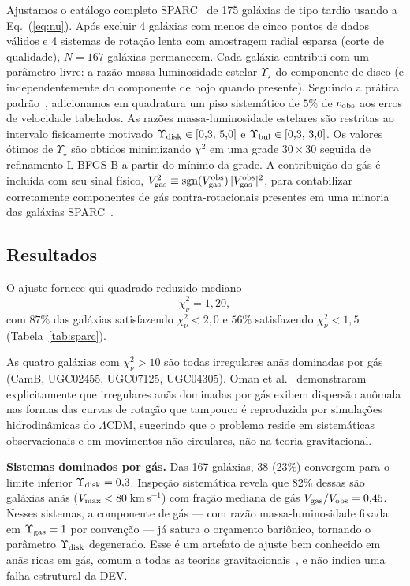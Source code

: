 \documentclass[aps,prd,twocolumn,showpacs,superscriptaddress]{revtex4-2}
\newcommand{\LCDM}{$\Lambda$CDM}
\begin{document}
Ajustamos o catálogo completo SPARC~\cite{Lelli2016} de 175
galáxias de tipo tardio usando a Eq.~(\ref{eq:nu}).
Após excluir 4 galáxias com menos de cinco pontos de dados
válidos e 4 sistemas de rotação lenta com amostragem radial
esparsa (corte de qualidade), $N=167$ galáxias permanecem.
Cada galáxia contribui com um parâmetro livre: a razão
massa-luminosidade estelar $\Upsilon_\star$ do componente de
disco (e independentemente do componente de bojo quando presente).
Seguindo a prática padrão~\cite{Li2018}, adicionamos em quadratura
um piso sistemático de $5\%$ de $v_{\rm obs}$ aos erros de
velocidade tabelados.
As razões massa-luminosidade estelares são restritas ao intervalo
fisicamente motivado $\Upsilon_{\rm disk} \in [0{,}3,\,5{,}0]$ e
$\Upsilon_{\rm bul} \in [0{,}3,\,3{,}0]$.
Os valores ótimos de $\Upsilon_\star$ são obtidos minimizando
$\chi^2$ em uma grade $30\times30$ seguida de refinamento L-BFGS-B
a partir do mínimo da grade.
A contribuição do gás é incluída com seu sinal físico,
$V_{\rm gas}^2 \equiv {\rm sgn}(V_{\rm gas}^{\rm obs})\,
|V_{\rm gas}^{\rm obs}|^2$, para contabilizar corretamente
componentes de gás contra-rotacionais presentes em uma minoria
das galáxias SPARC~\cite{Oman2015}.

\subsection{Resultados}

O ajuste fornece qui-quadrado reduzido mediano
\begin{equation}
  \widetilde\chi^2_\nu = 1{,}20,
\end{equation}
com $87\%$ das galáxias satisfazendo $\chi^2_\nu < 2{,}0$ e
$56\%$ satisfazendo $\chi^2_\nu < 1{,}5$ (Tabela~\ref{tab:sparc}).

As quatro galáxias com $\chi^2_\nu > 10$ são todas irregulares anãs
dominadas por gás (CamB, UGC02455, UGC07125, UGC04305).
Oman et al.~\cite{Oman2015} demonstraram explicitamente que
irregulares anãs dominadas por gás exibem dispersão anômala nas
formas das curvas de rotação que tampouco é reproduzida por
simulações hidrodinâmicas do \LCDM{}, sugerindo que o problema
reside em sistemáticas observacionais e em movimentos não-circulares,
não na teoria gravitacional.

\textbf{Sistemas dominados por gás.}
Das 167 galáxias, 38 (23\%) convergem para o limite inferior
$\Upsilon_{\rm disk} = 0{,}3$.
Inspeção sistemática revela que 82\% dessas são galáxias anãs
($V_{\rm max} < 80$\,km\,s$^{-1}$) com fração mediana de gás
$V_{\rm gas}/V_{\rm obs} = 0{,}45$.
Nesses sistemas, a componente de gás — com razão massa-luminosidade
fixada em $\Upsilon_{\rm gas} = 1$ por convenção — já satura o
orçamento bariônico, tornando o parâmetro $\Upsilon_{\rm disk}$
degenerado. Esse é um artefato de ajuste bem conhecido em anãs
ricas em gás, comum a todas as teorias gravitacionais~\cite{Oman2015,Li2018},
e não indica uma falha estrutural da DEV.
\end{document}
